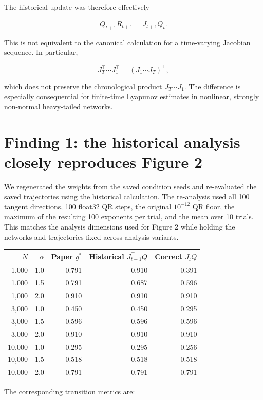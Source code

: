 \documentclass[11pt]{article}
\begin{document}
The historical update was therefore effectively

\[
Q_{t+1}R_{t+1}=J_{t+1}^{\top}Q_t.
\]

This is not equivalent to the canonical calculation for a time-varying
Jacobian sequence. In particular,

\[
J_T^\top\cdots J_1^\top=(J_1\cdots J_T)^\top,
\]

which does not preserve the chronological product
$J_T\cdots J_1$. The difference is especially consequential for finite-time
Lyapunov estimates in nonlinear, strongly non-normal heavy-tailed networks.

\section{Finding 1: the historical analysis closely reproduces Figure 2}

We regenerated the weights from the saved condition seeds and re-evaluated the
saved trajectories using the historical calculation. The re-analysis used all
100 tangent directions, 100 float32 QR steps, the original $10^{-12}$ QR
floor, the maximum of the resulting 100 exponents per trial, and the mean over
10 trials. This matches the analysis dimensions used for Figure 2 while
holding the networks and trajectories fixed across analysis variants.

\begin{center}
\begin{tabular}{rrrrr}
\toprule
$N$ & $\alpha$ & Paper $g^*$ & Historical $J_{t+1}^\top Q$ & Correct $J_tQ$ \\
\midrule
1,000 & 1.0 & 0.791 & 0.910 & 0.391 \\
1,000 & 1.5 & 0.791 & 0.687 & 0.596 \\
1,000 & 2.0 & 0.910 & 0.910 & 0.910 \\
3,000 & 1.0 & 0.450 & 0.450 & 0.295 \\
3,000 & 1.5 & 0.596 & 0.596 & 0.596 \\
3,000 & 2.0 & 0.910 & 0.910 & 0.910 \\
10,000 & 1.0 & 0.295 & 0.295 & 0.256 \\
10,000 & 1.5 & 0.518 & 0.518 & 0.518 \\
10,000 & 2.0 & 0.791 & 0.791 & 0.791 \\
\bottomrule
\end{tabular}
\end{center}

The corresponding transition metrics are:
\end{document}
